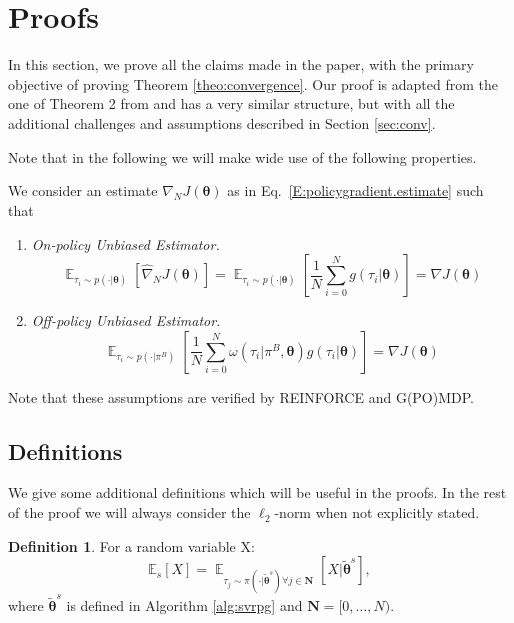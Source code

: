 \documentclass{article}
\theoremstyle{remark}
\theoremstyle{definition}
\newtheorem{definition}{Definition}[section]
\newcommand{\todopir}[1]{\todo[color=blued, inline]{\small #1}}
\DeclareMathOperator*{\EV}{\mathbb{E}}
\newcommand{\EVV}[2][\ppvect \in \ppspace]{\EV_{#1}\left[{#2}\right]}
\newcommand{\vtheta}{\boldsymbol{\theta}}
\newcommand{\Es}[1]{\mathbb{E}_{s}\left[#1\right]}
\newcommand{\wt}[1]{\widetilde{#1}}
\newcommand{\wh}[1]{\widehat{#1}}
\begin{document}



\section{Proofs}\label{app:proofs}
In this section, we prove all the claims made in the paper, with the primary objective of proving Theorem \ref{theo:convergence}.
Our proof is adapted from the one of Theorem 2 from \cite{reddi2016stochastic} and has a very similar structure, but with all the additional challenges and assumptions described in Section \ref{sec:conv}.

Note that in the following we will make wide use of the following properties.
\begin{assumption}\label{asm:unbiasedness}
        We consider an estimate $\wh{\nabla}_N J(\vtheta)$ as in Eq.~\ref{E:policygradient.estimate} such that
\begin{enumerate}
        \item \textit{On-policy Unbiased Estimator.} 
                \[
                        \EVV[\tau_i \sim p(\cdot|\vtheta)]{\wh{\nabla}_N J(\vtheta)} = \EVV[\tau_i \sim p(\cdot|\vtheta)]{\frac{1}{N} \sum_{i=0}^N g(\tau_i|\vtheta)} = \nabla J(\vtheta)
                \]
        \item \textit{Off-policy Unbiased Estimator.}
                \[
        \EVV[\tau_i \sim p(\cdot|\pi^B)]{\frac{1}{N} \sum_{i=0}^N \omega(\tau_i|\pi^B,\vtheta) g(\tau_i|\vtheta) } 
        = \nabla J(\vtheta) 
                \]
\end{enumerate}
\end{assumption}
Note that these assumptions are verified by REINFORCE and G(PO)MDP.

\subsection*{Definitions}
We give some additional definitions which will be useful in the proofs.
In the rest of the proof we will always consider the $\ell_2$-norm when not explicitly stated.

\begin{definition}
For a random variable X:
\[
	\Es{X} = \EVV[\tau_j\sim\pi(\cdot\vert\wt{\vtheta}^s)
		\forall j\in\mathbf{N}]{X\vert\wt{\vtheta}^s},
\]
where $\wt{\vtheta}^s$ is defined in Algorithm \ref{alg:svrpg} and $\mathbf{N} = [0,\dots,N)$.
\end{definition}
\end{document}
